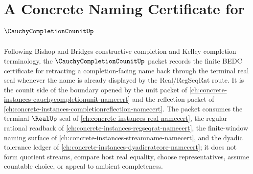 \chapter{A Concrete Naming Certificate for $\CauchyCompletionCounitUp$}
\label{ch:concrete-instances-cauchy-completion-counit-namecert}

Following Bishop and Bridges constructive completion and Kelley completion terminology, the $\CauchyCompletionCounitUp$ packet records the finite BEDC certificate for retracting a completion-facing name back through the terminal real seal whenever the name is already displayed by the Real/RegSeqRat route. It is the counit side of the boundary opened by the unit packet of \autoref{ch:concrete-instances-cauchycompletionunit-namecert} and the reflection packet of \autoref{ch:concrete-instances-completionreflection-namecert}. The packet consumes the terminal $\RealUp$ seal of \autoref{ch:concrete-instances-real-namecert}, the regular rational readback of \autoref{ch:concrete-instances-regseqrat-namecert}, the finite-window naming surface of \autoref{ch:concrete-instances-streamname-namecert}, and the dyadic tolerance ledger of \autoref{ch:concrete-instances-dyadicratcore-namecert}; it does not form quotient streams, compare host real equality, choose representatives, assume countable choice, or appeal to ambient completeness.


